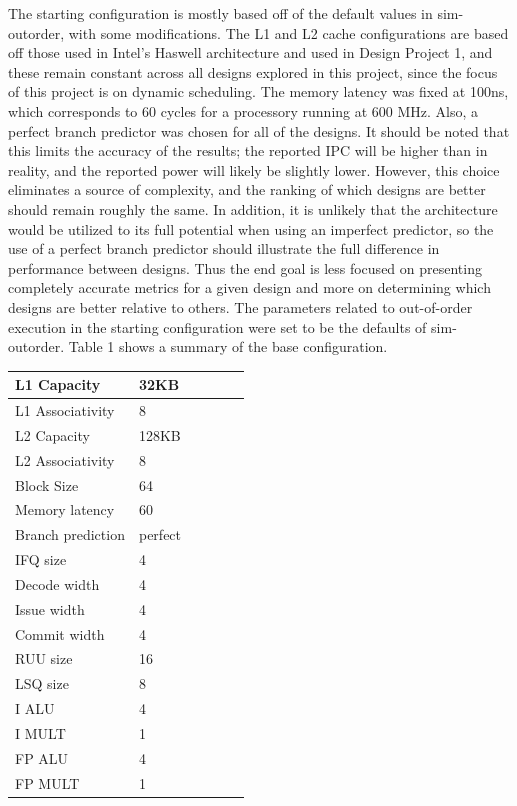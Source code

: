 \documentclass[english]{article}
\begin{document}
The starting configuration is mostly based off of the default values in sim-outorder, with some modifications. The L1 and L2 cache configurations are based off those used in Intel's Haswell architecture and used in Design Project 1, and these remain constant across all designs explored in this project, since the focus of this project is on dynamic scheduling. The memory latency was fixed at 100ns, which corresponds to 60 cycles for a processory running at 600 MHz. Also, a perfect branch predictor was chosen for all of the designs. It should be noted that this limits the accuracy of the results; the reported IPC will be higher than in reality, and the reported power will likely be slightly lower. However, this choice eliminates a source of complexity, and the ranking of which designs are better should remain roughly the same. In addition, it is unlikely that the architecture would be utilized to its full potential when using an imperfect predictor, so the use of a perfect branch predictor should illustrate the full difference in performance between designs. Thus the end goal is less focused on presenting completely accurate metrics for a given design and more on determining which designs are better relative to  others. The parameters related to out-of-order execution in the starting configuration were set to be the defaults of sim-outorder. Table 1 shows a summary of the base configuration.

\begin{center}
    \singlespacing
	\vspace{.30cm}
	\begin{tabular}{ | l | l | l | l | l | l |}
	\hline
      L1 Capacity & 32KB \\ \hline
      L1 Associativity & 8 \\ \hline
      L2 Capacity & 128KB \\ \hline
      L2 Associativity & 8 \\ \hline
      Block Size & 64 \\ \hline
      Memory latency & 60 \\ \hline
      Branch prediction & perfect \\ \hline
	  IFQ size & 4 \\ \hline
      Decode width & 4 \\ \hline
      Issue width & 4 \\ \hline
      Commit width & 4 \\ \hline
      RUU size & 16 \\ \hline
      LSQ size & 8 \\ \hline
      I ALU & 4 \\ \hline
      I MULT & 1 \\ \hline
      FP ALU & 4 \\ \hline
      FP MULT & 1 \\ \hline
	\end{tabular}
\end{center}
\end{document}
